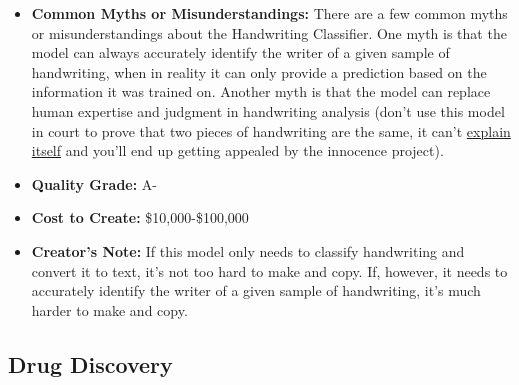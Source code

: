 \begin{itemize}
    \item \textbf{Common Myths or Misunderstandings:} There are a few common myths or misunderstandings about the Handwriting Classifier. One myth is that the model can always accurately identify the writer of a given sample of handwriting, when in reality it can only provide a prediction based on the information it was trained on. Another myth is that the model can replace human expertise and judgment in handwriting analysis (don't use this model in court to prove that two pieces of handwriting are the same, it can't \hyperref[sec:explain]{explain itself} and you'll end up getting appealed by the innocence project).
    \item \textbf{Quality Grade:} A-
    \item \textbf{Cost to Create:} \$10,000-\$100,000
    \item \textbf{Creator's Note:} If this model only needs to classify handwriting and convert it to text, it's not too hard to make and copy. If, however, it needs to accurately identify the writer of a given sample of handwriting, it's much harder to make and copy.
\end{itemize}

\subsection{Drug Discovery}

